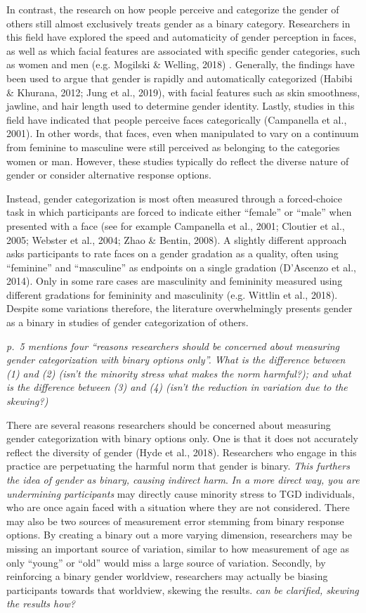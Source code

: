 \documentclass[
  man]{apa7}
\begin{document}
In contrast, the research on how people perceive and categorize the gender of others still almost exclusively treats gender as a binary category. Researchers in this field have explored the speed and automaticity of gender perception in faces, as well as which facial features are associated with specific gender categories, such as women and men (e.g. Mogilski \& Welling, 2018) . Generally, the findings have been used to argue that gender is rapidly and automatically categorized (Habibi \& Khurana, 2012; Jung et al., 2019), with facial features such as skin smoothness, jawline, and hair length used to determine gender identity. Lastly, studies in this field have indicated that people perceive faces categorically (Campanella et al., 2001). In other words, that faces, even when manipulated to vary on a continuum from feminine to masculine were still perceived as belonging to the categories women or man. However, these studies typically do reflect the diverse nature of gender or consider alternative response options.

Instead, gender categorization is most often measured through a forced-choice task in which participants are forced to indicate either ``female'' or ``male'' when presented with a face (see for example Campanella et al., 2001; Cloutier et al., 2005; Webster et al., 2004; Zhao \& Bentin, 2008). A slightly different approach asks participants to rate faces on a gender gradation as a quality, often using ``feminine'' and ``masculine'' as endpoints on a single gradation (D'Ascenzo et al., 2014). Only in some rare cases are masculinity and femininity measured using different gradations for femininity and masculinity (e.g. Wittlin et al., 2018). Despite some variations therefore, the literature overwhelmingly presents gender as a binary in studies of gender categorization of others.

\emph{p.~5 mentions four ``reasons researchers should be concerned about measuring gender categorization with binary options only''. What is the difference between (1) and (2) (isn't the minority stress what makes the norm harmful?); and what is the difference between (3) and (4) (isn't the reduction in variation due to the skewing?)}

There are several reasons researchers should be concerned about measuring gender categorization with binary options only. One is that it does not accurately reflect the diversity of gender (Hyde et al., 2018). Researchers who engage in this practice are perpetuating the harmful norm that gender is binary. \emph{This furthers the idea of gender as binary, causing indirect harm}. \emph{In a more direct way, you are undermining participants} may directly cause minority stress to TGD individuals, who are once again faced with a situation where they are not considered. There may also be two sources of measurement error stemming from binary response options. By creating a binary out a more varying dimension, researchers may be missing an important source of variation, similar to how measurement of age as only ``young'' or ``old'' would miss a large source of variation. Secondly, by reinforcing a binary gender worldview, researchers may actually be biasing participants towards that worldview, skewing the results. \emph{can be clarified, skewing the results how?}
\end{document}
